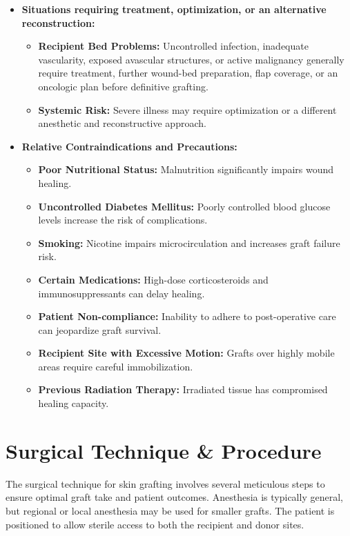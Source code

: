 \begin{itemize}
  \item \textbf{Situations requiring treatment, optimization, or an alternative reconstruction:}
    \begin{itemize}
      \item \textbf{Recipient Bed Problems:} Uncontrolled infection, inadequate vascularity, exposed avascular structures, or active malignancy generally require treatment, further wound-bed preparation, flap coverage, or an oncologic plan before definitive grafting.
      \item \textbf{Systemic Risk:} Severe illness may require optimization or a different anesthetic and reconstructive approach.
    \end{itemize}
  
  \item \textbf{Relative Contraindications and Precautions:}
    \begin{itemize}
      \item \textbf{Poor Nutritional Status:} Malnutrition significantly impairs wound healing.
      \item \textbf{Uncontrolled Diabetes Mellitus:} Poorly controlled blood glucose levels increase the risk of complications.
      \item \textbf{Smoking:} Nicotine impairs microcirculation and increases graft failure risk.
      \item \textbf{Certain Medications:} High-dose corticosteroids and immunosuppressants can delay healing.
      \item \textbf{Patient Non-compliance:} Inability to adhere to post-operative care can jeopardize graft survival.
      \item \textbf{Recipient Site with Excessive Motion:} Grafts over highly mobile areas require careful immobilization.
      \item \textbf{Previous Radiation Therapy:} Irradiated tissue has compromised healing capacity.
    \end{itemize}
\end{itemize}

\section*{Surgical Technique \& Procedure}
The surgical technique for skin grafting involves several meticulous steps to ensure optimal graft take and patient outcomes. Anesthesia is typically general, but regional or local anesthesia may be used for smaller grafts. The patient is positioned to allow sterile access to both the recipient and donor sites.

